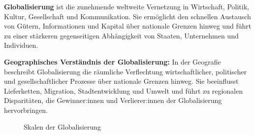 \begin{mydefinition}[Globalisierung]
\textbf{Globalisierung} ist die zunehmende weltweite Vernetzung in Wirtschaft, Politik, Kultur, Gesellschaft und Kommunikation. Sie ermöglicht den schnellen Austausch von Gütern, Informationen und Kapital über nationale Grenzen hinweg und führt zu einer stärkeren gegenseitigen Abhängigkeit von Staaten, Unternehmen und Individuen.

\textbf{Geographisches Verständnis der Globalisierung:} In der Geografie beschreibt Globalisierung die räumliche Verflechtung wirtschaftlicher, politischer und gesellschaftlicher Prozesse über nationale Grenzen hinweg. Sie beeinflusst Lieferketten, Migration, Stadtentwicklung und Umwelt und führt zu regionalen Disparitäten, die Gewinner:innen und Verlierer:innen der Globalisierung hervorbringen.

\begin{figure}[H]
    \centering
    \caption{Skalen der Globalisierung}
    \label{fig:scales}
\end{figure}
\end{mydefinition}
\clearpage

